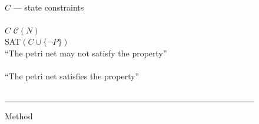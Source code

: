 \begin{figure}[t]
\begin{minipage}[t]{.94\columnwidth}
    \algVars\\
    \tabT $C$ — state constraints \\
    \algBegin\\
    \tabT $C$ \algAssgn $\mathcal C(N)$ \\
    \tabT \algIf SAT$(C \cup \{\neg P\})$ \algThen \\
    \tabTT \algReturn ``The petri net may not satisfy the property'' \\
    \tabT \algElse \\
    \tabTT \algReturn ``The petri net satisfies the property'' \\
    \tabT \algFi \\
    \algEnd
  \end{minipage}
  \vspace{1.5ex}
  \hrule
\caption{Method \safety}
\label{fig_method_safety}
\end{figure}
